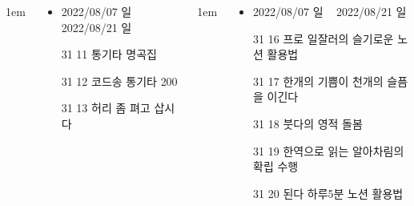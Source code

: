\documentclass[	20pt, 
							a1paper, 
							portrait, %
							margin=0mm, %
							innermargin=10mm,  		%
							colspace=5mm, 
							subcolspace=0mm
							]{tikzposter}
\begin{document}
\begin{columns}
			{
					\setlength{\leftmargini}{4em}
					\setlength{\labelsep} {1em}
				\begin{LARGE}
					\begin{itemize}
					\item 	2022/08/07 일 ~ 2022/08/21 일
					\item 	[31 11] 통기타 명곡집
					\item 	[31 12] 코드송 통기타 200
					\item 	[31 13]  허리 좀 펴고 삽시다
					\end{itemize}
				\end{LARGE}
			}



			{
					\setlength{\leftmargini}{4em}
					\setlength{\labelsep} {1em}
				\begin{LARGE}
					\begin{itemize}
					\item 	2022/08/07 일 ~ 2022/08/21 일
					\item 	[31 16]  프로 일잘러의 슬기로운 노션 활용법
					\item 	[31 17]  한개의 기쁨이 천개의 슬픔을 이긴다
					\item 	[31 18]  붓다의 영적 돌봄
					\item 	[31 19]  한역으로 읽는 알아차림의 확립 수행
					\item 	[31 20]  된다 하루5분 노션 활용법
					\end{itemize}
				\end{LARGE}
			}










%




	\end{columns}
\end{document}

